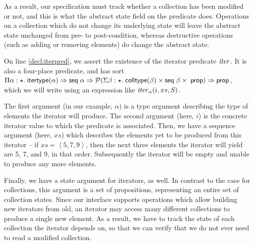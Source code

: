 As a result, our specification must track whether a collection has
been modified or not, and this is what the abstract state field on the
predicate does. Operations on a collection which do not change its
underlying state will leave the abstract state unchanged from pre- to
post-condition, whereas destructive operations (such as adding or
removing elements) do change the abstract state.

On line \ref{decl:iterpred}, we assert the existence of the iterator
predicate $\mathit{iter}$.  It is also a four-place predicate, and has
sort $\Pi \alpha:\star.\; \mathsf{itertype}(\alpha) \Rightarrow \mathsf{seq}\;{\alpha} \Rightarrow
\mathcal{P}(\Sigma \beta:\star.\;\mathsf{colltype}(\beta) \times \mathsf{seq}\;{\beta}
  \times \;\mathsf{prop}) \Rightarrow \mathsf{prop}$, which we will write using an
expression like $\mathit{iter}_\alpha(i, xs, S)$.

The first argument (in our example, $\alpha$) is a type argument
describing the type of elements the iterator will produce. The second
argument (here, $i$) is the concrete iterator value to which the
predicate is associated. Then, we have a sequence argument (here,
$xs$) which describes the elements yet to be produced from this
iterator -- if $xs = \left<5, 7, 9\right>$, then the next three
elements the iterator will yield are 5, 7, and 9, in that order.
Subsequently the iterator will be empty and unable to produce any
more elements.

Finally, we have a state argument for iterators, as well. In contrast
to the case for collections, this argument is a set of propositions,
representing an entire set of collection states. Since our interface
supports operations which allow building new iterators from old, an
iterator may access many different collections to produce a single new
element. As a result, we have to track the state of each collection
the iterator depends on, so that we can verify that we do not ever
need to read a modified collection.


